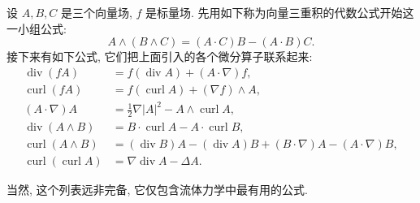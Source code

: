 设 $A,B,C$ 是三个向量场, $f$ 是标量场. 先用如下称为向量三重积的代数公式开始这一小组公式:
\begin{equation}
 A\wedge(B\wedge C)=(A\cdot C)B-(A\cdot B)C.
 \label{eq:app-a-vector-triple-product}
\end{equation}
接下来有如下公式, 它们把上面引入的各个微分算子联系起来:
\begin{align}
 \operatorname{div}(fA)&=f(\operatorname{div}A)+(A\cdot\nabla)f,
 \label{eq:app-a-div-scalar-vector}\\
 \operatorname{curl}(fA)&=f(\operatorname{curl}A)+(\nabla f)\wedge A,
 \label{eq:app-a-curl-scalar-vector}\\
 (A\cdot\nabla)A&=\frac12\nabla|A|^2-A\wedge\operatorname{curl}A,
 \label{eq:app-a-convective-identity}\\
 \operatorname{div}(A\wedge B)&=B\cdot\operatorname{curl}A-A\cdot\operatorname{curl}B,
 \label{eq:app-a-div-vector-product}\\
 \operatorname{curl}(A\wedge B)&=(\operatorname{div}B)A-(\operatorname{div}A)B
 +(B\cdot\nabla)A-(A\cdot\nabla)B,
 \label{eq:app-a-curl-vector-product}\\
 \operatorname{curl}(\operatorname{curl}A)&=\nabla\operatorname{div}A-\Delta A.
 \label{eq:app-a-curl-curl}
\end{align}

当然, 这个列表远非完备, 它仅包含流体力学中最有用的公式.
